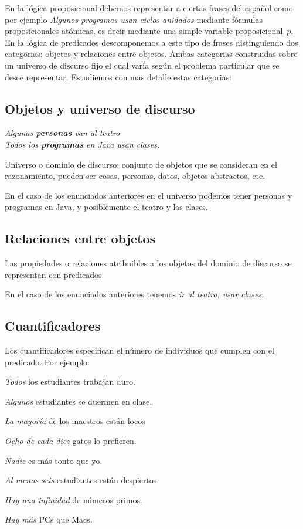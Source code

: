 \documentclass[11pt,letterpaper]{article}
\begin{document}
En la lógica proposicional debemos representar a ciertas frases del español
como por ejemplo
\bc
\emph{Algunos programas usan ciclos anidados}
\ec
mediante fórmulas proposicionales atómicas, es decir mediante una simple 
variable proposicional~$p$. 
En la lógica de predicados descomponemos a este tipo de
frases distinguiendo dos categorias: objetos y relaciones entre
objetos. Ambas categorias construidas sobre un universo de discurso fijo el 
cual varía según el problema particular que se desee representar. 
Estudiemos con mas detalle estas categorias:

\subsection{Objetos y universo de discurso}
\bc
 \emph{Algunas \textbf{personas} van al teatro} \\
 \emph{Todos los \textbf{programas} en Java usan clases.}
\ec
  
\bi
 \item Universo o dominio de discurso: conjunto de objetos que se consideran 
  en el razonamiento, pueden ser cosas, personas, datos, objetos abstractos, 
  etc.
   
 \item En el caso de los enunciados anteriores en el universo podemos tener 
  personas y programas en Java, y  posiblemente el teatro y las clases.
\ei


\subsection{Relaciones entre objetos}
\bi
 \item Las propiedades o relaciones atribuibles a los objetos del dominio de 
  discurso se representan con predicados.

 \item En el caso de los enunciados anteriores tenemos \emph{ir al teatro, usar 
  clases}.
\ei

\subsection{Cuantificadores}
Los cuantificadores especifican el número de individuos que cumplen con el 
predicado. Por ejemplo:
\bi
\item \emph{Todos} los estudiantes trabajan duro.
\item \emph{Algunos} estudiantes se duermen en clase.
\item \emph{La mayoría} de los maestros están locos
\item \emph{Ocho de cada diez} gatos lo prefieren.
\item \emph{Nadie} es más tonto que yo.
\item \emph{Al menos seis} estudiantes están despiertos.
\item \emph{Hay una infinidad} de números primos.
\item \emph{Hay más} PCs que Macs.
\ei
\end{document}
